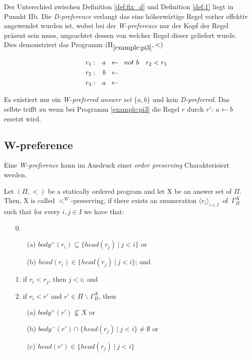 Der Unterschied zwischen Definition \ref{def:fix_d} und Definition \ref{def:1}
liegt in Punnkt IIb. Die \emph{D-preference} verlangt das eine höherwärtige
Regel vorher effektiv angewendet wurden ist, wobei bei der \emph{W-preference}
nur der Kopf der Regel präsent sein muss, ungeachtet dessen von welcher Regel
dieser geliefert wurde.\\
Dies demonstriert das Programm $(\Pi_{\ref{example:pi3}}, <)$

\begin{example}[$\Pi_{\ref{example:pi3}}, <$]
  \begin{align*}
    r_1: && a \hspace*{0.2cm}&\leftarrow \hspace*{0.2cm} not~b &  r_2 < r_1\\
    r_2: && b \hspace*{0.2cm}&\leftarrow\\
    r_3: && a \hspace*{0.2cm}&\leftarrow
  \end{align*}
  \label{example:pi3}
\end{example}

Es existiert nur ein \emph{W-preferred} \emph{answer set} $\{a, b\}$ und kein
\emph{D-preferred}. Das selbte trifft zu wenn bei Programm \ref{example:pi3}
die Regel $r$ durch $r':~a\leftarrow b$ ersetzt wird.


\subsection{W-preference}
Eine \emph{W-preference} kann im Ausdruck einer \emph{order preserving}
Charakterisiert werden.

\begin{definition}
  Let $(\Pi, <)$ be a statically ordered program and let X be an answer set of $\Pi$.
  Then, X is called $<^W$-preserving, if there exists an enumeration
  $\langle r_i \rangle_{i \in I}$~of~$\Gamma_{\Pi}^X$ such that for every $i, j \in I$
  we have that:
  \begin{itemize}
    \item[0.] 
      \begin{itemize}
        \item[(a)] $body^+(r_i) \subseteq \{ head(r_j)~|~j<i\}$ or
        \item[(b)] $head(r_i) \in \{ head(r_j)~|~j<i\}$; and
      \end{itemize}
    \item[1.] if $r_i < r_j$, then $j<i$; and \\
    \item[2.] if $r_i < r'$ and $r' \in \Pi \backslash \Gamma_{\Pi}^X$, then
      \begin{itemize}
        \item[(a)] $body^+(r') \not \subseteq X$ or
        \item[(b)] $body^-(r') \cap \{head(r_j)~|~j<i\} \not = \emptyset$ or
        \item[(c)] $head(r') \in \{head(r_j)~|~j<i\}$
      \end{itemize}
  \end{itemize}
\end{definition}

